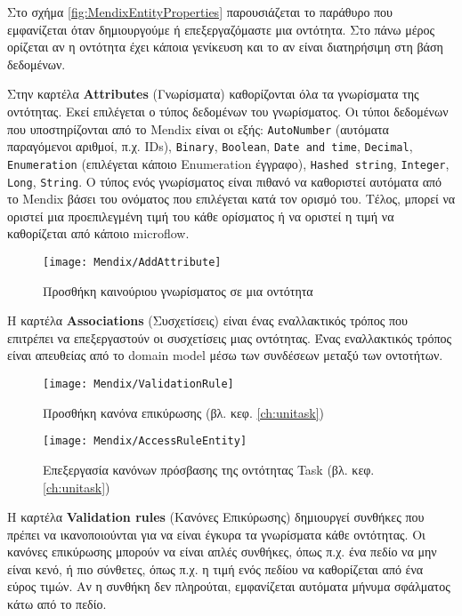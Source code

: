                 Στο σχήμα \ref{fig:MendixEntityProperties} παρουσιάζεται το παράθυρο που εμφανίζεται όταν δημιουργούμε ή επεξεργαζόμαστε μια οντότητα. Στο πάνω μέρος ορίζεται αν η οντότητα έχει κάποια γενίκευση και το αν είναι διατηρήσιμη στη βάση δεδομένων.

                Στην καρτέλα \textbf{Attributes} (Γνωρίσματα) καθορίζονται όλα τα γνωρίσματα της οντότητας. Εκεί επιλέγεται ο τύπος δεδομένων του γνωρίσματος. Οι τύποι δεδομένων που υποστηρίζονται από το Mendix είναι οι εξής: \texttt{AutoNumber} (αυτόματα παραγόμενοι αριθμοί, π.χ. IDs), \texttt{Binary}, \texttt{Boolean}, \texttt{Date and time}, \texttt{Decimal}, \texttt{Enumeration} (επιλέγεται κάποιο Enumeration έγγραφο), \texttt{Hashed string}, \texttt{Integer}, \texttt{Long}, \texttt{String}. Ο τύπος ενός γνωρίσματος είναι πιθανό να καθοριστεί αυτόματα από το Mendix βάσει του ονόματος που επιλέγεται κατά τον ορισμό του. Τέλος, μπορεί να οριστεί μια προεπιλεγμένη τιμή του κάθε ορίσματος ή να οριστεί η τιμή να καθορίζεται από κάποιο microflow.

                \begin{figure}[h!] \noindent \centering
                    \texttt{[image: Mendix/AddAttribute]}
                    \caption{\centering Προσθήκη καινούριου γνωρίσματος σε μια οντότητα}
                \end{figure}

                Η καρτέλα \textbf{Associations} (Συσχετίσεις) είναι ένας εναλλακτικός τρόπος που επιτρέπει να επεξεργαστούν οι συσχετίσεις μιας οντότητας. Ένας εναλλακτικός τρόπος είναι απευθείας από το domain model μέσω των συνδέσεων μεταξύ των οντοτήτων.

                \begin{figure}[h!] \noindent \centering
                    \texttt{[image: Mendix/ValidationRule]}
                    \caption{\centering Προσθήκη κανόνα επικύρωσης (βλ. κεφ. \ref{ch:unitask})}
                \end{figure}

                \begin{figure}[h!] \noindent \centering
                    \texttt{[image: Mendix/AccessRuleEntity]}
                    \caption{\centering Επεξεργασία κανόνων πρόσβασης της οντότητας Task (βλ. κεφ. \ref{ch:unitask})}
                \end{figure}

                Η καρτέλα \textbf{Validation rules} (Κανόνες Επικύρωσης) δημιουργεί συνθήκες που πρέπει να ικανοποιούνται για να είναι έγκυρα τα γνωρίσματα κάθε οντότητας. Οι κανόνες επικύρωσης μπορούν να είναι απλές συνθήκες, όπως π.χ. ένα πεδίο να μην είναι κενό, ή πιο σύνθετες, όπως π.χ. η τιμή ενός πεδίου να καθορίζεται από ένα εύρος τιμών. Αν η συνθήκη δεν πληρούται, εμφανίζεται αυτόματα μήνυμα σφάλματος κάτω από το πεδίο.

